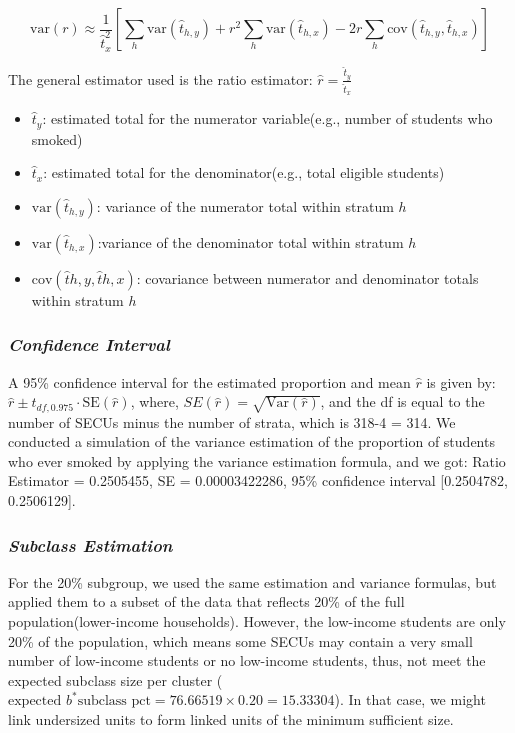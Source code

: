 \documentclass[
  12pt]{article}
\begin{document}
\[
\text{var}(r) \approx \frac{1}{\hat{t}_x^2} \left[ \sum_h \text{var}(\hat{t}_{h,y}) + r^2 \sum_h \text{var}(\hat{t}_{h,x}) - 2r \sum_h \text{cov}(\hat{t}_{h,y}, \hat{t}_{h,x}) \right]
\]

The general estimator used is the ratio estimator:
\(\hat{r} = \frac{\hat{t}_y}{\hat{t}_x}\)

\begin{itemize}
\item
  \(\hat{t}_y\): estimated total for the numerator variable(e.g., number
  of students who smoked)
\item
  \(\hat{t}_x\): estimated total for the denominator(e.g., total
  eligible students)
\item
  \(\text{var}(\hat{t}_{h,y})\): variance of the numerator total within
  stratum \(h\)
\item
  \(\text{var}(\hat{t}_{h,x})\):variance of the denominator total within
  stratum \(h\)
\item
  \(\text{cov}(\hat{t}{h,y}, \hat{t}{h,x})\): covariance between
  numerator and denominator totals within stratum \(h\)
\end{itemize}

\subsubsection{\texorpdfstring{\emph{Confidence
Interval}}{Confidence Interval}}\label{confidence-interval}

A 95\% confidence interval for the estimated proportion and mean
\(\hat{r}\) is given by:
\(\hat{r} \pm t_{df, 0.975} \cdot \text{SE}(\hat{r})\), where,
\(SE(\hat{r}) = \sqrt{\text{Var}(\hat{r})}\), and the df is equal to the
number of SECUs minus the number of strata, which is 318-4 = 314. We
conducted a simulation of the variance estimation of the proportion of
students who ever smoked by applying the variance estimation formula,
and we got: Ratio Estimator = 0.2505455, SE = 0.00003422286, 95\%
confidence interval {[}0.2504782, 0.2506129{]}.

\subsubsection{\texorpdfstring{\emph{Subclass
Estimation}}{Subclass Estimation}}\label{subclass-estimation}

For the 20\% subgroup, we used the same estimation and variance
formulas, but applied them to a subset of the data that reflects 20\% of
the full population(lower-income households). However, the low-income
students are only 20\% of the population, which means some SECUs may
contain a very small number of low-income students or no low-income
students, thus, not meet the expected subclass size per cluster (
\(\text{expected }b^* \text{subclass pct} = 76.66519 \times 0.20 = 15.33304\)).
In that case, we might link undersized units to form linked units of the
minimum sufficient size.
\end{document}
